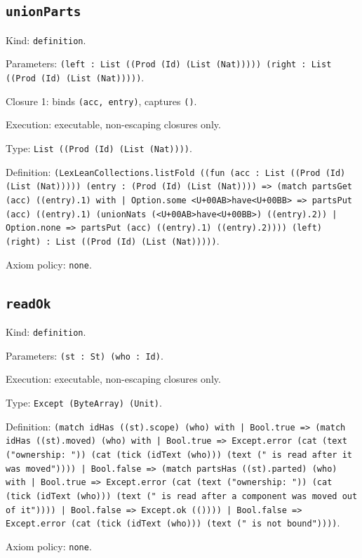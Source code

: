 \documentclass[11pt]{article}
\begin{document}
\subsection*{\texttt{unionParts}}
\noindent Kind: \texttt{definition}.\par
\noindent Parameters: \texttt{(left : List ((Prod (Id) (List (Nat))))) (right : List ((Prod (Id) (List (Nat)))))}.\par
\noindent Closure 1: binds \texttt{(acc, entry)}, captures \texttt{()}.\par
\noindent Execution: executable, non-escaping closures only.\par
\noindent Type: \texttt{List ((Prod (Id) (List (Nat))))}.\par
\noindent Definition: \texttt{(LexLeanCollections.listFold ((fun (acc : List ((Prod (Id) (List (Nat))))) (entry : (Prod (Id) (List (Nat)))) => (match partsGet (acc) ((entry).1) with | Option.some <U+00AB>have<U+00BB> => partsPut (acc) ((entry).1) (unionNats (<U+00AB>have<U+00BB>) ((entry).2)) | Option.none => partsPut (acc) ((entry).1) ((entry).2)))) (left) (right) : List ((Prod (Id) (List (Nat)))))}.\par
\noindent Axiom policy: \texttt{none}.\par
\subsection*{\texttt{readOk}}
\noindent Kind: \texttt{definition}.\par
\noindent Parameters: \texttt{(st : St) (who : Id)}.\par
\noindent Execution: executable, non-escaping closures only.\par
\noindent Type: \texttt{Except (ByteArray) (Unit)}.\par
\noindent Definition: \texttt{(match idHas ((st).scope) (who) with | Bool.true => (match idHas ((st).moved) (who) with | Bool.true => Except.error (cat (text ("ownership: ")) (cat (tick (idText (who))) (text (" is read after it was moved")))) | Bool.false => (match partsHas ((st).parted) (who) with | Bool.true => Except.error (cat (text ("ownership: ")) (cat (tick (idText (who))) (text (" is read after a component was moved out of it")))) | Bool.false => Except.ok (()))) | Bool.false => Except.error (cat (tick (idText (who))) (text (" is not bound"))))}.\par
\noindent Axiom policy: \texttt{none}.\par
\end{document}
